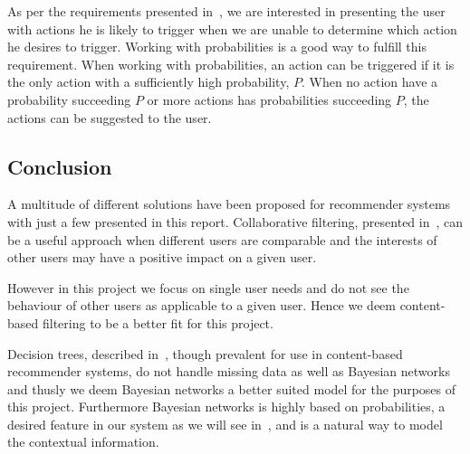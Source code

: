 As per the requirements presented in~, we are interested in presenting the user with actions he is likely to trigger when we are unable to determine which action he desires to trigger. Working with probabilities is a good way to fulfill this requirement. When working with probabilities, an action can be triggered if it is the only action with a sufficiently high probability, $P$. When no action have a probability succeeding $P$ or more actions has probabilities succeeding $P$, the actions can be suggested to the user.


\subsection{Conclusion}
\label{sec:analysis:recommender-methods:conclusion}

A multitude of different solutions have been proposed for recommender systems~\cite{adomavicius2005toward} with just a few presented in this report.
Collaborative filtering, presented in~, can be a useful approach when different users are comparable and the interests of other users may have a positive impact on a given user.

However in this project we focus on single user needs and do not see the behaviour of other users as applicable to a given user. Hence we deem content-based filtering to be a better fit for this project.

Decision trees, described in~, though prevalent for use in content-based recommender systems, do not handle missing data as well as Bayesian networks and thusly we deem Bayesian networks a better suited model for the purposes of this project. Furthermore Bayesian networks is highly based on probabilities, a desired feature in our system as we will see in~, and is a natural way to model the contextual information.

